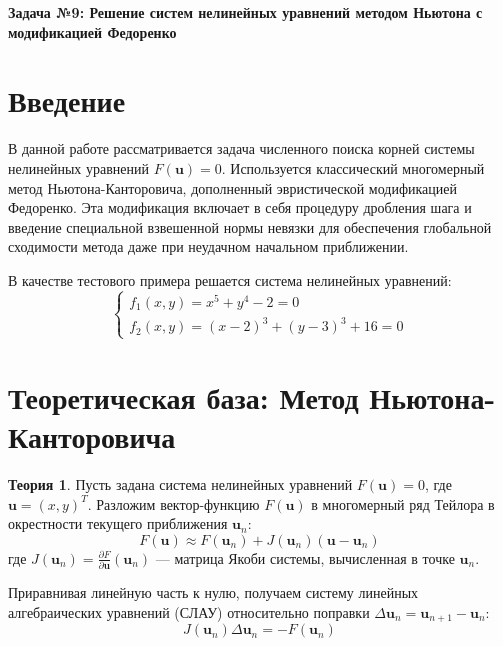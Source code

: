 \documentclass[12pt, a4paper]{article}
\theoremstyle{definition}
\newtheorem*{theory}{Теория}
\begin{document}
\begin{center}
    \Large\bfseries Задача №9: Решение систем нелинейных уравнений методом Ньютона с модификацией Федоренко \\
\end{center}

\vspace{0.5cm}

\section{Введение}
В данной работе рассматривается задача численного поиска корней системы нелинейных уравнений $F(\bm{u}) = 0$. Используется классический многомерный метод Ньютона-Канторовича, дополненный эвристической модификацией Федоренко. Эта модификация включает в себя процедуру дробления шага и введение специальной взвешенной нормы невязки для обеспечения глобальной сходимости метода даже при неудачном начальном приближении.

В качестве тестового примера решается система нелинейных уравнений:
\[
\begin{cases} 
f_1(x,y) = x^5 + y^4 - 2 = 0 \\ 
f_2(x,y) = (x-2)^3 + (y-3)^3 + 16 = 0 
\end{cases}
\]

\section{Теоретическая база: Метод Ньютона-Канторовича}
\begin{theory}
Пусть задана система нелинейных уравнений $F(\bm{u}) = 0$, где $\bm{u} = (x, y)^T$.
Разложим вектор-функцию $F(\bm{u})$ в многомерный ряд Тейлора в окрестности текущего приближения $\bm{u}_n$:
\[
F(\bm{u}) \approx F(\bm{u}_n) + J(\bm{u}_n) (\bm{u} - \bm{u}_n)
\]
где $J(\bm{u}_n) = \frac{\partial F}{\partial \bm{u}}(\bm{u}_n)$ --- матрица Якоби системы, вычисленная в точке $\bm{u}_n$.

Приравнивая линейную часть к нулю, получаем систему линейных алгебраических уравнений (СЛАУ) относительно поправки $\Delta \bm{u}_n = \bm{u}_{n+1} - \bm{u}_n$:
\[
J(\bm{u}_n) \Delta \bm{u}_n = -F(\bm{u}_n)
\]
\end{theory}
\end{document}
